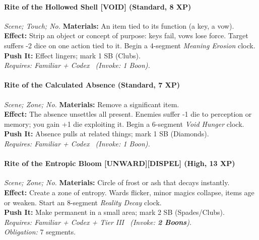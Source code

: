 \paragraph{Rite of the Hollowed Shell \textnormal{[VOID]} (Standard, 8 XP)} \emph{Scene; Touch; No.}
\textbf{Materials:} An item tied to its function (a key, a vow).\\
\textbf{Effect:} Strip an object or concept of purpose: keys fail, vows lose force. Target suffers -2 dice on one action tied to it. Begin a 4-segment \emph{Meaning Erosion} clock.\\
\textbf{Push It:} Effect lingers; mark 1 SB (Clubs).\\
\emph{Requires: Familiar + Codex \ (\textit{Invoke:} 1 Boon).}

\paragraph{Rite of the Calculated Absence (Standard, 7 XP)} \emph{Scene; Zone; No.}
\textbf{Materials:} Remove a significant item.\\
\textbf{Effect:} The absence unsettles all present. Enemies suffer -1 die to perception or memory; you gain +1 die exploiting it. Begin a 6-segment \emph{Void Hunger} clock.\\
\textbf{Push It:} Absence pulls at related things; mark 1 SB (Diamonds).\\
\emph{Requires: Familiar + Codex \ (\textit{Invoke:} 1 Boon).}

\paragraph{Rite of the Entropic Bloom \textnormal{[UNWARD][DISPEL]} (High, 13 XP)} \emph{Scene; Zone; No.}
\textbf{Materials:} Circle of frost or ash that decays instantly.\\
\textbf{Effect:} Create a zone of entropy. Wards flicker, minor magics collapse, items age or weaken. Start an 8-segment \emph{Reality Decay} clock.\\
\textbf{Push It:} Make permanent in a small area; mark 2 SB (Spades/Clubs).\\
\emph{Requires: Familiar + Codex + Tier III \ (\textit{Invoke:} \textbf{2 Boons}).}\\
\emph{Obligation:} 7 segments.

